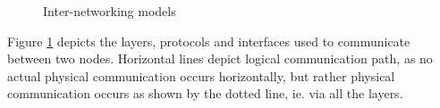 \begin{figure}
  \caption{Inter-networking models}
  \label{fig:refmodels}
\end{figure}



Figure \ref{fig:refmodels} depicts the layers, protocols and interfaces used to communicate between two nodes. Horizontal lines depict logical communication path, as no actual physical communication occurs horizontally, but rather physical communication occurs as shown by the dotted line, ie. via all the layers. 

